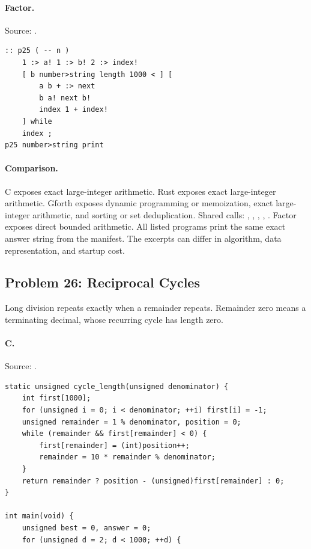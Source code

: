 \paragraph{Factor.} Source: .
\begin{lstlisting}
:: p25 ( -- n )
    1 :> a! 1 :> b! 2 :> index!
    [ b number>string length 1000 < ] [
        a b + :> next
        b a! next b!
        index 1 + index!
    ] while
    index ;
p25 number>string print
\end{lstlisting}

\paragraph{Comparison.}
C exposes exact large-integer arithmetic. Rust exposes exact large-integer arithmetic. Gforth exposes dynamic programming or memoization, exact large-integer arithmetic, and sorting or set deduplication. Shared calls: \texttt{}, \texttt{}, \texttt{}, \texttt{}, \texttt{}. Factor exposes direct bounded arithmetic.
All listed programs print the same exact answer string from the manifest. The excerpts can differ in algorithm, data representation, and startup cost.

\subsection{Problem 26: Reciprocal Cycles}
\label{walkthrough:p26}
Long division repeats exactly when a remainder repeats. Remainder zero means a terminating decimal, whose recurring cycle has length zero.

\paragraph{C.} Source: .
\begin{lstlisting}
static unsigned cycle_length(unsigned denominator) {
    int first[1000];
    for (unsigned i = 0; i < denominator; ++i) first[i] = -1;
    unsigned remainder = 1 % denominator, position = 0;
    while (remainder && first[remainder] < 0) {
        first[remainder] = (int)position++;
        remainder = 10 * remainder % denominator;
    }
    return remainder ? position - (unsigned)first[remainder] : 0;
}

int main(void) {
    unsigned best = 0, answer = 0;
    for (unsigned d = 2; d < 1000; ++d) {
\end{lstlisting}

